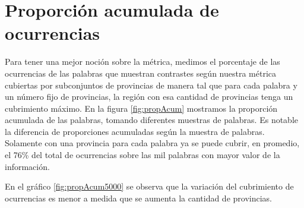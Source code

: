 \section{Proporción acumulada de ocurrencias} %
\label{proporcionDeOcurrencias}

Para tener una mejor noción sobre la métrica, medimos el porcentaje de las ocurrencias de las palabras que muestran contrastes según nuestra métrica cubiertas por subconjuntos de provincias de manera tal que para cada palabra y un número fijo de provincias, la región con esa cantidad de provincias tenga un cubrimiento máximo. 
En la figura \ref{fig:propAcum} mostramos la proporción acumulada de las palabras, tomando diferentes muestras de palabras. Es notable la diferencia de proporciones acumuladas según la muestra de palabras. Solamente con una provincia para cada palabra ya se puede cubrir, en promedio, el 76\% del total de ocurrencias sobre las mil palabras con mayor valor de la información.

En el gráfico \ref{fig:propAcum5000} se observa que la variación del cubrimiento de ocurrencias es menor a medida que se aumenta la cantidad de provincias. 



